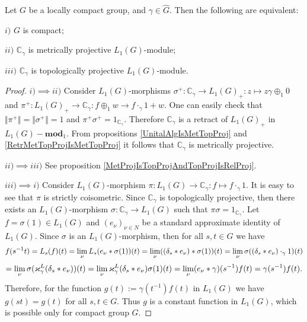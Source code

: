 \begin{proposition}\label{OneDimL1ModMetTopProjCharac} Let $G$ be a locally compact group, and $\gamma\in\widehat{G}$. Then the following are equivalent:

$i)$ $G$ is compact;

$ii)$ $\mathbb{C}_\gamma$ is metrically projective $L_1(G)$-module;

$iii)$ $\mathbb{C}_\gamma$ is topologically projective $L_1(G)$-module.
\end{proposition}
\begin{proof} $i)$$\implies$$ ii)$ Consider $L_1(G)$-morphisms $\sigma^+:\mathbb{C}_\gamma\to L_1(G)_+:z\mapsto z\gamma \oplus_1 0$ and $\pi^+:L_1(G)_+\to\mathbb{C}_\gamma: f\oplus_1 w\to f\cdot_{\gamma}1+w$. One can easily check that $\Vert\pi^+\Vert=\Vert\sigma^+\Vert=1$ and $\pi^+\sigma^+=1_{\mathbb{C}_\gamma}$. Therefore $\mathbb{C}_\gamma$ is a retract of $L_1(G)_+$ in $L_1(G)-\mathbf{mod}_1$. From propositions \ref{UnitalAlgIsMetTopProj} and \ref{RetrMetTopProjIsMetTopProj} it follows that $\mathbb{C}_\gamma$ is metrically projective.

$ii)$$\implies$$ iii)$ See proposition \ref{MetProjIsTopProjAndTopProjIsRelProj}.

$iii)$$\implies$$i)$ Consider $L_1(G)$-morphism $\pi:L_1(G)\to\mathbb{C}_\gamma:f\mapsto f\cdot_{\gamma} 1$. It is easy to see that $\pi$ is strictly coisometric. Since $\mathbb{C}_\gamma$ is topologically projective, then there exists an $L_1(G)$-morphism $\sigma:\mathbb{C}_\gamma\to L_1(G)$ such that $\pi\sigma=1_{\mathbb{C}_\gamma}$. Let $f=\sigma(1)\in L_1(G)$ and $(e_\nu)_{\nu\in N}$ be a standard approximate identity of $L_1(G)$. Since $\sigma$ is an $L_1(G)$-morphism, then for all $s,t\in G$ we have 
$$
f(s^{-1}t)
=L_s(f)(t)
=\lim_\nu L_s(e_\nu\ast \sigma(1))(t)
=\lim_\nu((\delta_s\ast e_\nu)\ast \sigma(1))(t)
=\lim_\nu\sigma((\delta_s\ast e_\nu)\cdot_{\gamma} 1)(t)
$$
$$
=\lim_\nu\sigma(\varkappa_\gamma^L(\delta_s\ast e_\nu))(t)
=\lim_\nu\varkappa_\gamma^L(\delta_s\ast e_\nu)\sigma(1)(t)
=\lim_\nu(e_\nu\ast\gamma)(s^{-1})f(t)
=\gamma(s^{-1})f(t).
$$
Therefore, for the function $g(t):=\gamma(t^{-1})f(t)$ in $L_1(G)$ we have $g(st)=g(t)$ for all $s,t\in G$. Thus $g$ is a constant function in $L_1(G)$, which is possible only for compact group $G$.
\end{proof}

